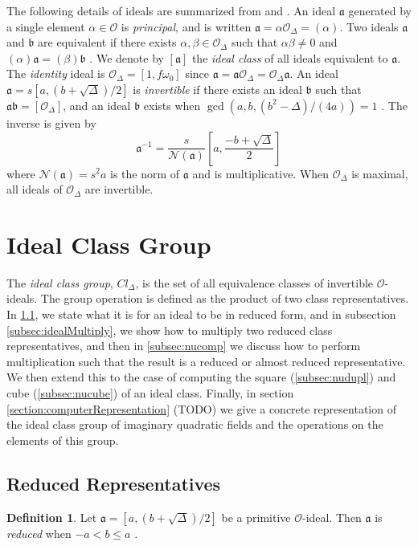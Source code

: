 \documentclass{ucalgthes1}
\theoremstyle{definition}
\newtheorem{defn}[thm]{Definition}
\newcommand{\OO}{\mathcal{O}}
\begin{document}
The following details of ideals are summarized from \cite[pp.14,15]{Jacobson1999} and \cite[p.88]{Jacobson2009}. An ideal $\mathfrak{a}$ generated by a single element $\alpha \in \OO$ is \emph{principal}, and is written $\mathfrak{a} = \alpha \OO_\Delta = (\alpha)$.  Two ideals $\mathfrak a$ and $\mathfrak b$ are equivalent if there exists $\alpha, \beta \in \OO_\Delta$ such that $\alpha \beta \neq 0$ and $(\alpha)\mathfrak a = (\beta) \mathfrak b$ \cite[p.88]{Jacobson2009}. We denote by $[\mathfrak a]$ the \emph{ideal class} of all ideals equivalent to $\mathfrak a$. The \emph{identity} ideal is $\OO_\Delta = [1, f\omega_0]$ since $\mathfrak a = \mathfrak a \OO_\Delta = \OO_\Delta \mathfrak a$.  An ideal $\mathfrak a = s[a, (b+\sqrt{\Delta})/2]$ is \emph{invertible} if there exists an ideal $\mathfrak b$ such that $\mathfrak a \mathfrak b = [\OO_\Delta]$, and an ideal $\mathfrak b$ exists when $\gcd(a, b, (b^2-\Delta)/(4a)) = 1$ \cite[p.14]{Jacobson1999}. The inverse is given by \cite[pp.14,15]{Jacobson1999}
\[
	{\mathfrak a}^{-1} = \frac{s}{\mathcal N(\mathfrak a)} \left[a, \frac{-b+\sqrt{\Delta}}{2} \right]
\]
where $\mathcal N(\mathfrak a) = s^2a$ is the norm of $\mathfrak a$ and is multiplicative. When $\OO_\Delta$ is maximal, all ideals of $\OO_\Delta$ are invertible.


\bigbreak
\section{Ideal Class Group}

The \emph{ideal class group}, $Cl_\Delta$, is the set of all equivalence classes of invertible $\OO$-ideals.  The group operation is defined as the product of two class representatives.  In \ref{subsec:reduction}, we state what it is for an ideal to be in reduced form, and in subsection \ref{subsec:idealMultiply}, we show how to multiply two reduced class representatives, and then in \ref{subsec:nucomp} we discuss how to perform multiplication such that the result is a reduced or almost reduced representative.  We then extend this to the case of computing the square (\ref{subsec:nudupl}) and cube (\ref{subsec:nucube}) of an ideal class.  Finally, in section \ref{section:computerRepresentation} (TODO) we give a concrete representation of the ideal class group of imaginary quadratic fields and the operations on the elements of this group. 

\subsection{Reduced Representatives}
\label{subsec:reduction}
\begin{defn}
Let $\mathfrak{a} = [a, (b+\sqrt{\Delta})/2]$ be a primitive $\OO$-ideal. Then $\mathfrak{a}$ is \emph{reduced} when $-a < b \le a$ \cite[p.13]{Jacobson1999}.
\end{defn}
\end{document}
